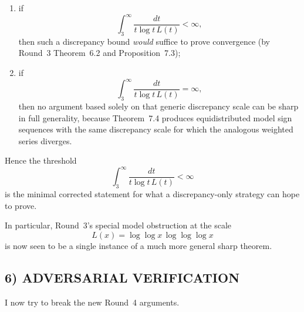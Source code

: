 \begin{enumerate}
\item[(a)] if
\[
\int_3^\infty \frac{dt}{t\log t\,L(t)}<\infty,
\]
then such a discrepancy bound \emph{would} suffice to prove convergence (by Round~3 Theorem~6.2 and Proposition~7.3);

\item[(b)] if
\[
\int_3^\infty \frac{dt}{t\log t\,L(t)}=\infty,
\]
then no argument based solely on that generic discrepancy scale can be sharp in full generality, because Theorem~7.4 produces equidistributed model sign sequences with the same discrepancy scale for which the analogous weighted series diverges.
\end{enumerate}

Hence the threshold
\[
\int_3^\infty \frac{dt}{t\log t\,L(t)}<\infty
\]
is the minimal corrected statement for what a discrepancy-only strategy can hope to prove.

\medskip

In particular, Round~3's special model obstruction at the scale
\[
L(x)=\log\log x\,\log\log\log x
\]
is now seen to be a single instance of a much more general sharp theorem.

\subsection*{6) ADVERSARIAL VERIFICATION}

I now try to break the new Round~4 arguments.

